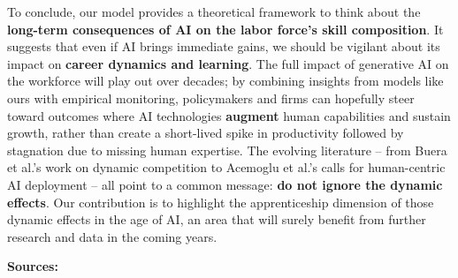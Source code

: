 \documentclass[12pt]{article}
\begin{document}
To conclude, our model provides a theoretical framework to think about
the \textbf{long-term consequences of AI on the labor force's skill
composition}. It suggests that even if AI brings immediate gains, we
should be vigilant about its impact on \textbf{career dynamics and
learning}. The full impact of generative AI on the workforce will play
out over decades; by combining insights from models like ours with
empirical monitoring, policymakers and firms can hopefully steer toward
outcomes where AI technologies \textbf{augment} human capabilities and
sustain growth, rather than create a short-lived spike in productivity
followed by stagnation due to missing human expertise. The evolving
literature -- from Buera et al.'s work on dynamic competition to
Acemoglu et al.'s calls for human-centric AI deployment -- all point to
a common message: \textbf{do not ignore the dynamic effects}. Our
contribution is to highlight the apprenticeship dimension of those
dynamic effects in the age of AI, an area that will surely benefit from
further research and data in the coming years.

\textbf{Sources:}
\end{document}
